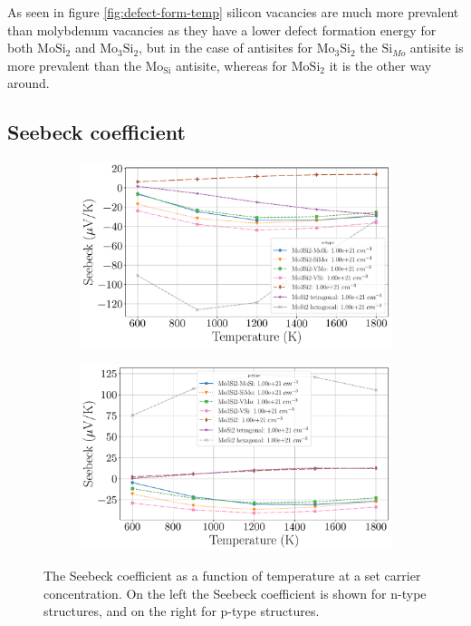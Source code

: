 \documentclass[12pt]{article}
\theoremstyle{plain}
\theoremstyle{definition}
\newcommand{\<}{\langle}
\renewcommand{\>}{\rangle}
\begin{document}
As seen in figure \ref{fig:defect-form-temp} silicon vacancies are much more prevalent than molybdenum vacancies as they have a lower defect formation energy for both $\text{Mo}\text{Si}_2$ and $\text{Mo}_3\text{Si}_2$, but in the case of antisites for $\text{Mo}_3\text{Si}_2$ the $\text{Si}_{Mo}$ antisite is more prevalent than the $\text{Mo}_{\text{Si}}$ antisite, whereas for $\text{Mo}\text{Si}_2$ it is the other way around. 

\subsection{Seebeck coefficient}


\begin{figure}[t!]
\centering
\begin{subfigure}{.5\textwidth}
  \centering
  \includegraphics[width=\linewidth]{allmats_S_temp_doping_n}
  \caption{}
  \label{fig:sub1}
\end{subfigure}%
\begin{subfigure}{.5\textwidth}
  \centering
  \includegraphics[width=\linewidth]{allmats_S_temp_doping_p}
  \caption{}
  \label{fig:sub2}
\end{subfigure}
\caption{The Seebeck coefficient as a function of temperature at a set carrier concentration. On the left the Seebeck coefficient is shown for n-type structures, and on the right for p-type structures.}
\label{fig:S-Temp}
\end{figure}
\end{document}
